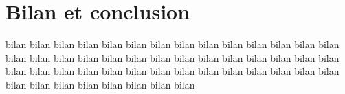 \chapter{Bilan et conclusion}
 bilan bilan bilan bilan bilan bilan bilan bilan bilan bilan bilan bilan bilan bilan bilan bilan bilan bilan bilan bilan bilan bilan bilan bilan bilan
 bilan bilan bilan bilan bilan bilan bilan bilan bilan bilan bilan bilan bilan bilan bilan bilan bilan bilan bilan bilan bilan bilan bilan bilan bilan
